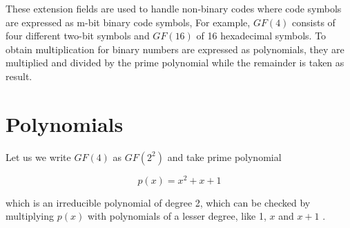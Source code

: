 \documentclass[../main.tex]{subfiles}
\begin{document}
    These extension fields are used to handle non-binary codes where code symbols are expressed as m-bit binary code symbols, For example, $GF(4)$ consists of four different two-bit symbols and $GF(16)$ of 16 hexadecimal symbols. To obtain multiplication for binary numbers are expressed as polynomials, they are multiplied and divided by the prime polynomial while the remainder is taken as result.


    \section{Polynomials}
    Let us we write $GF(4)$ as $GF(2^2)$ and take prime polynomial

    \begin{equation*}
        p(x) = x^2 + x + 1
    \end{equation*}

    \noindent
    which is an irreducible polynomial of degree 2, which can be checked by multiplying $p(x)$ with polynomials of a lesser degree, like 1, $x$ and $x+1$ \autocite{blahut1983theory}.
\end{document}
